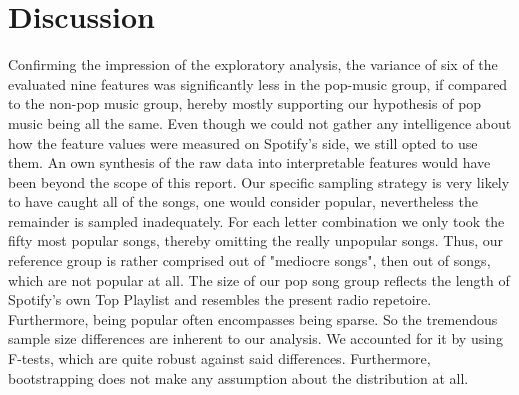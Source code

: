 \documentclass{article}
\begin{document}
\section{Discussion}
Confirming the impression of the exploratory analysis, the variance of six of the evaluated nine features was significantly less in the pop-music group, if compared to the non-pop music group, hereby mostly supporting our hypothesis of pop music being all the same.
Even though we could not gather any intelligence about how the feature values were measured on Spotify's side, we still opted to use them. An own synthesis of the raw data into interpretable features would have been beyond the scope of this report. 
Our specific sampling strategy is very likely to have caught all of the songs, one would consider popular, nevertheless the remainder is sampled inadequately. For each letter combination we only took the fifty most popular songs, thereby omitting the really unpopular songs. Thus, our reference group is rather comprised out of "mediocre songs", then out of songs, which are not popular at all.   
The size of our pop song group reflects the length of Spotify's own Top Playlist and resembles the present radio repetoire. Furthermore, being popular often encompasses being sparse. So the tremendous sample size differences are inherent to our analysis. We accounted for it by using F-tests, which are quite robust against said differences. Furthermore, bootstrapping does not make any assumption about the distribution at all. 
\end{document}
